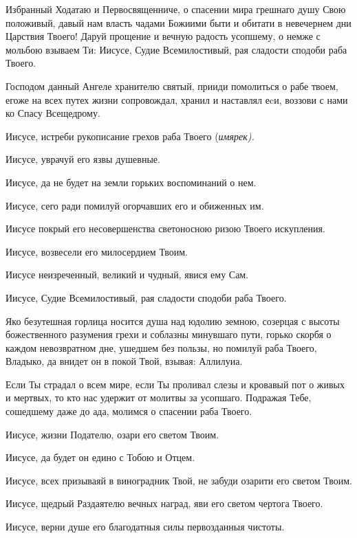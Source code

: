 
\normalfont{}Избранный Ходатаю и Первосвященниче, о спасении мира грешнаго душу Свою положивый, давый нам власть чадами Божиими быти и обитати в невечернем дни Царствия Твоего! Даруй прощение и вечную радость усопшему, о немже с мольбою взываем Ти: Иисусе, Судие Всемилостивый, рая сладости сподоби раба Твоего.




Господом данный Ангеле хранителю святый, прииди помолиться о рабе твоем, егоже на всех путех жизни сопровождал, хранил и наставлял еcи, воззови с нами ко Спасу Всещедрому. 

Иисусе, истреби рукописание грехов раба Твоего (\itshape имярек\normalfont{}). 

Иисусе, уврачуй его язвы душевные. 

Иисусе, да не будет на земли горьких воспоминаний о нем. 

Иисусе, сего ради помилуй огорчавших его и обиженных им. 

Иисусе покрый его несовершенства светоносною ризою Твоего искупления. 

Иисусе, возвесели его милосердием Твоим. 

Иисусе неизреченный, великий и чудный, явися ему Сам. 

Иисусе, Судие Всемилостивый, рая сладости сподоби раба Твоего.




Яко безутешная горлица носится душа над юдолию земною, созерцая с высоты божественного разумения грехи и соблазны минувшаго пути, горько скорбя о каждом невозвратном дне, ушедшем без пользы, но помилуй раба Твоего, Владыко, да внидет он в покой Твой, взывая: Аллилуиа.




Если Ты страдал о всем мире, если Ты проливал слезы и кровавый пот о живых и мертвых, то кто нас удержит от молитвы за усопшаго. Подражая Тебе, сошедшему даже до ада, молимся о спасении раба Твоего. 

Иисусе, жизни Подателю, озари его светом Твоим. 

Иисусе, да будет он едино с Тобою и Отцем. 

Иисусе, всех призываяй в виноградник Твой, не забуди озарити его светом Твоим. 

Иисусе, щедрый Раздаятелю вечных наград, яви его светом чертога Твоего. 

Иисусе, верни душе его благодатныя силы первозданныя чистоты. 

